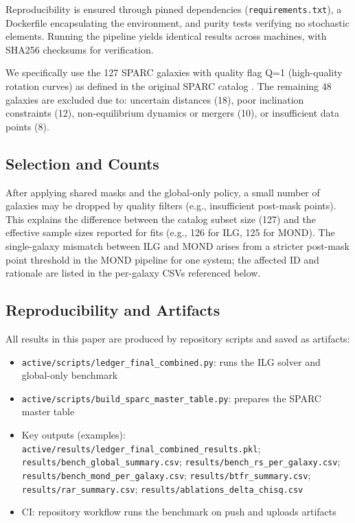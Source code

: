 \documentclass[usenatbib]{mnras}
\begin{document}
Reproducibility is ensured through pinned dependencies (\texttt{requirements.txt}), a Dockerfile encapsulating the environment, and purity tests verifying no stochastic elements. Running the pipeline yields identical results across machines, with SHA256 checksums for verification.

We specifically use the 127 SPARC galaxies with quality flag Q=1 (high-quality rotation curves) as defined in the original SPARC catalog \citep{lelli2016sparc}. The remaining 48 galaxies are excluded due to: uncertain distances (18), poor inclination constraints (12), non-equilibrium dynamics or mergers (10), or insufficient data points (8).

\subsection{Selection and Counts}
\noindent After applying shared masks and the global-only policy, a small number of galaxies may be dropped by quality filters (e.g., insufficient post-mask points). This explains the difference between the catalog subset size (127) and the effective sample sizes reported for fits (e.g., 126 for ILG, 125 for MOND). The single-galaxy mismatch between ILG and MOND arises from a stricter post-mask point threshold in the MOND pipeline for one system; the affected ID and rationale are listed in the per-galaxy CSVs referenced below.

\subsection{Reproducibility and Artifacts}

All results in this paper are produced by repository scripts and saved as artifacts:
\begin{itemize}
  \item \texttt{active/scripts/ledger\_final\_combined.py}: runs the ILG solver and global-only benchmark
  \item \texttt{active/scripts/build\_sparc\_master\_table.py}: prepares the SPARC master table
  \item Key outputs (examples): \texttt{active/results/ledger\_final\_combined\_results.pkl}; \texttt{results/bench\_global\_summary.csv}; \texttt{results/bench\_rs\_per\_galaxy.csv}; \texttt{results/bench\_mond\_per\_galaxy.csv}; \texttt{results/btfr\_summary.csv}; \texttt{results/rar\_summary.csv}; \texttt{results/ablations\_delta\_chisq.csv}
  \item CI: repository workflow runs the benchmark on push and uploads artifacts
\end{itemize}
\end{document}
